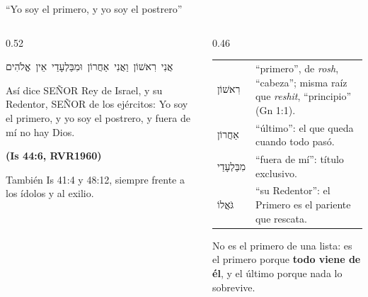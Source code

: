 \documentclass[hyperref={bookmarks=false},aspectratio=169]{beamer}
\newcommand{\heb}[1]{\mbox{\foreignlanguage{hebrew}{#1}}}
\newcommand{\SENOR}{S{\fontsize{0.78em}{1em}\selectfont EÑOR}}
\newcommand{\fuente}[1]{\par\hfill{\upshape\bfseries\footnotesize\textcolor{azul}{#1}}}
\newcommand{\destacar}[1]{\textbf{\textcolor{azul}{#1}}}
\begin{document}
\begin{frame}{``Yo soy el primero, y yo soy el postrero''}
\begin{columns}[t,onlytextwidth]
\begin{column}{0.52\textwidth}
\begin{center}\heb{אֲנִי רִאשׁוֹן וַאֲנִי אַחֲרוֹן וּמִבַּלְעָדַי אֵין אֱלֹהִים}\end{center}
\begin{cita}Así dice \SENOR{} Rey de Israel, y su Redentor, \SENOR{} de los ejércitos: Yo soy el primero, y yo soy el postrero, y fuera de mí no hay Dios.\fuente{(Is 44:6, RVR1960)}\end{cita}
\scriptsize También Is 41:4 y 48:12, siempre frente a los ídolos y al exilio.
\end{column}
\begin{column}{0.46\textwidth}\scriptsize\renewcommand{\arraystretch}{1.12}
\begin{tabular}{@{}>{\RaggedRight\arraybackslash}p{1.7cm}>{\RaggedRight\arraybackslash}p{3.7cm}@{}}
\toprule
\heb{רִאשׁוֹן} & ``primero'', de \emph{rosh}, ``cabeza''; misma raíz que \emph{reshit}, ``principio'' (Gn 1:1). \\
\heb{אַחֲרוֹן} & ``último'': el que queda cuando todo pasó. \\
\heb{מִבַּלְעָדַי} & ``fuera de mí'': título exclusivo. \\
\heb{גֹּאֲלוֹ} & ``su Redentor'': el Primero es el pariente que rescata. \\
\bottomrule
\end{tabular}\par\medskip
\small No es el primero de una lista: es el primero porque \destacar{todo viene de él}, y el último porque nada lo sobrevive.
\end{column}
\end{columns}
\end{frame}
\end{document}
